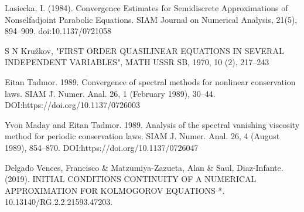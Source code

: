 \begin{thebibliography}{X}
 Lasiecka, I. (1984). Convergence Estimates for Semidiscrete Approximations of Nonselfadjoint Parabolic Equations. SIAM Journal on Numerical Analysis, 21(5), 894–909. doi:10.1137/0721058 

 S N Kružkov, "FIRST ORDER QUASILINEAR EQUATIONS IN SEVERAL INDEPENDENT VARIABLES", MATH USSR SB, 1970, 10 (2), 217–243 

 Eitan Tadmor. 1989. Convergence of spectral methods for nonlinear conservation laws. SIAM J. Numer. Anal. 26, 1 (February 1989), 30–44. DOI:https://doi.org/10.1137/0726003

 Yvon Maday and Eitan Tadmor. 1989. Analysis of the spectral vanishing viscosity method for periodic conservation laws. SIAM J. Numer. Anal. 26, 4 (August 1989), 854–870. DOI:https://doi.org/10.1137/0726047

 Delgado Vences, Francisco \& Matzumiya-Zazueta, Alan \& Saul, Diaz-Infante. (2019). INITIAL CONDITIONS CONTINUITY OF A NUMERICAL APPROXIMATION FOR KOLMOGOROV EQUATIONS *. 10.13140/RG.2.2.21593.47203. 





\end{thebibliography}